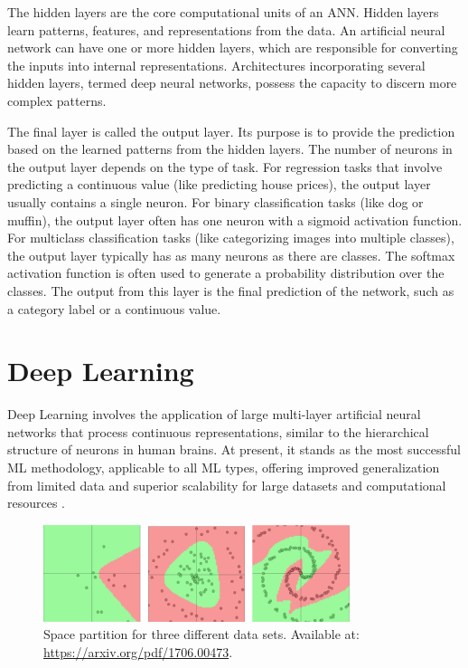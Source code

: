 The hidden layers are the core computational units of an ANN. Hidden layers learn patterns, features, and representations from the data. An artificial neural network can have one or more hidden layers, which are responsible for converting the inputs into internal representations. Architectures incorporating several hidden layers, termed deep neural networks, possess the capacity to discern more complex patterns.

The final layer is called the output layer. Its purpose is to provide the prediction based on the learned patterns from the hidden layers. The number of neurons in the output layer depends on the type of task. For regression tasks that involve predicting a continuous value (like predicting house prices), the output layer usually contains a single neuron. For binary classification tasks (like dog or muffin), the output layer often has one neuron with a sigmoid activation function. For multiclass classification tasks (like categorizing images into multiple classes), the output layer typically has as many neurons as there are classes. The softmax activation function is often used to generate a probability distribution over the classes. The output from this layer is the final prediction of the network, such as a category label or a continuous value.

\section{Deep Learning}

Deep Learning involves the application of large multi-layer artificial neural networks that process continuous representations, similar to the hierarchical structure of neurons in human brains. At present, it stands as the most successful ML methodology, applicable to all ML types, offering improved generalization from limited data and superior scalability for large datasets and computational resources \cite{manning2020ai}.

\begin{figure}[htbp]
    \centering
    \includegraphics[width=0.8\textwidth]{obrazky-figures/02-theoretical-basis/cnn-ds.png}
    \caption{Space partition for three different data sets. Available at: \url{https://arxiv.org/pdf/1706.00473}.}
    \label{fig:cnn-ds}
\end{figure}


